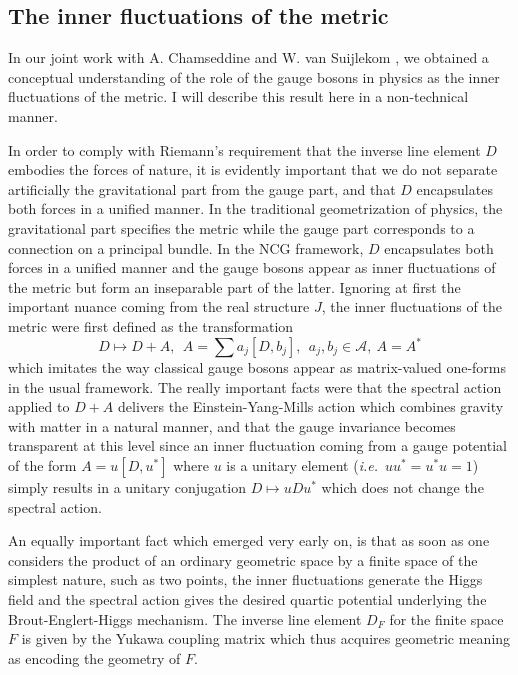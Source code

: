 \documentclass[12pt]{article}
\def\cA{{\mathcal A}}
\newcommand{\ie}{{\it i.e.\/}\ }
\begin{document}
\subsection{The inner fluctuations of the metric}

In our joint work with A. Chamseddine and W. van Suijlekom \cite{acinner}, we obtained a conceptual understanding of the role of the gauge bosons in physics as the inner fluctuations of the metric. I will describe this result here in a non-technical manner. 

In order to comply with Riemann's requirement that the inverse line element $D$ embodies the forces of nature, it is evidently important that we do not separate artificially the gravitational part from the gauge part, and that $D$ encapsulates both forces in a unified manner. In the traditional geometrization of physics, the gravitational part specifies the metric while the gauge part corresponds to a connection on a principal bundle. In the NCG framework, $D$ encapsulates both forces in a unified manner and the gauge bosons appear as inner fluctuations of the metric but form an inseparable part of the latter. Ignoring at first the important nuance coming from the real structure $J$, the inner fluctuations of the metric were first defined as the transformation 
$$
D\mapsto D+A, \ \ A=\sum a_j[D,b_j], \ \ a_j,  b_j \in \cA, \ A=A^*
$$ 
which imitates the way classical gauge bosons appear as matrix-valued one-forms in the usual framework. The really important facts were that the spectral action applied to $D+A$ delivers the Einstein-Yang-Mills action which combines gravity with matter in a natural manner, and that the gauge invariance becomes transparent at this level since an inner fluctuation coming from a gauge potential of the form $A=u[D,u^*]$ where $u$ is a unitary element (\ie $uu^*=u^*u=1$) simply results in a unitary conjugation $D\mapsto uDu^*$ which does not change the spectral action. 

An equally important fact which emerged very early on, is that as soon as one considers the product of an ordinary geometric space by a finite space of the simplest  nature, such as two points, the inner fluctuations generate the Higgs field and the spectral action gives the desired quartic potential underlying the Brout-Englert-Higgs mechanism. The inverse line element $D_F$ for the finite space $F$ is given by the Yukawa coupling matrix which thus acquires geometric meaning as encoding the geometry of $F$. 
\end{document}
